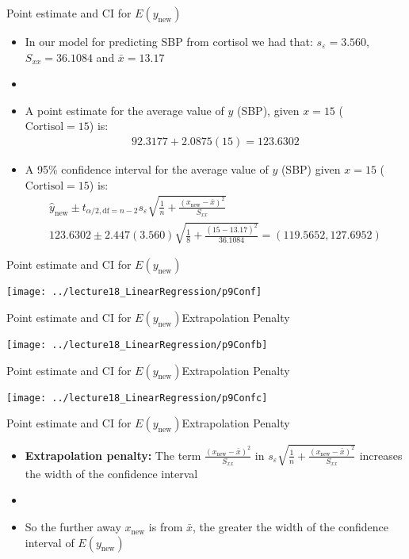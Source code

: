 \documentclass[xcolor=dvipsnames]{beamer}
\begin{document}
\begin{frame}{Point estimate and CI for $E(y_{\text{new}})$}
	\begin{itemize}
		\item In our model for predicting SBP from cortisol we had that: $s_{\varepsilon} = 3.560$, $S_{xx} = 36.1084$ and $\bar{x}=13.17$
		\item[]
		\item A point estimate for the average value of $y$ (SBP), given $x=15$ ($\text{Cortisol}=15$) is:
		\begin{gather*}
			92.3177 + 2.0875(15) = 123.6302
		\end{gather*}
		\item A 95\% confidence interval for the average value of $y$ (SBP) given $x=15$ ($\text{Cortisol}=15$) is:
		\begin{gather*}
			\hat{y}_{\text{new}} \pm t_{\alpha / 2, \text{df} = n-2}s_{\varepsilon}\sqrt{\frac{1}{n} + \frac{(x_{\text{new}}-\bar{x})^2}{S_{xx}}} \\
			123.6302 \pm 2.447 (3.560)\sqrt{\frac{1}{8} + \frac{(15-13.17)^2}{36.1084}} = (119.5652, 127.6952)
		\end{gather*}
	\end{itemize}
\end{frame}

\begin{frame}{Point estimate and CI for $E(y_{\text{new}})$}
\begin{center}
	\texttt{[image: ../lecture18\_LinearRegression/p9Conf]}
\end{center}
\end{frame}

\begin{frame}{Point estimate and CI for $E(y_{\text{new}})$}{Extrapolation Penalty}
	\begin{center}
		\texttt{[image: ../lecture18\_LinearRegression/p9Confb]}
	\end{center}
\end{frame}

\begin{frame}{Point estimate and CI for $E(y_{\text{new}})$}{Extrapolation Penalty}
\begin{center}
	\texttt{[image: ../lecture18\_LinearRegression/p9Confc]}
\end{center}
\end{frame}

\begin{frame}{Point estimate and CI for $E(y_{\text{new}})$}{Extrapolation Penalty}
\begin{itemize}
	\item \textbf{Extrapolation penalty:} The term $\frac{(x_{\text{new}}-\bar{x})^2}{S_{xx}}$ in $s_{\varepsilon}\sqrt{\frac{1}{n} + \frac{(x_{\text{new}}-\bar{x})^2}{S_{xx}}}$ increases the width of the confidence interval 
	\item[]
	\item So the further away $x_{\text{new}}$ is from $\bar{x}$, the greater the width of the confidence interval of $E(y_{\text{new}})$
\end{itemize}
\end{frame}
\end{document}
